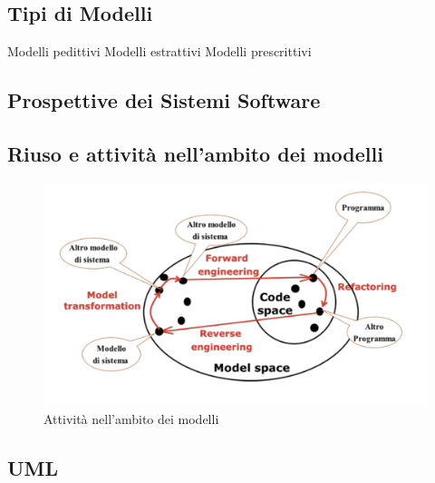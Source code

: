 \documentclass{article}
\begin{document}
	\subsection{Tipi di Modelli}
	Modelli pedittivi
	Modelli estrattivi
	Modelli prescrittivi
	\subsection{Prospettive dei Sistemi Software}
	\subsection{Riuso e attività nell’ambito dei modelli}
	\begin{figure}[h]
		\centering
		\includegraphics[scale=0.3]{23.attiv_mod.png}
		\caption{Attività nell’ambito dei modelli}
		\label{fig:im-23}
	\end{figure}
	\subsection{UML}
\end{document}
